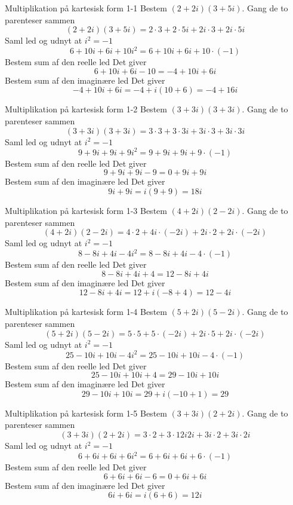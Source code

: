 \documentclass{article}
\begin{document}
\tableofcontents
\newpage
\begin{exercise}{Multiplikation på kartesisk form 1-1}
Bestem $(2 + 2i)(3 + 5i)$.
\hint
Gang de to parenteser sammen
\[(2 + 2i)(3 + 5i) = 2 \cdot 3 + 2 \cdot 5i + 2i \cdot 3 + 2i \cdot 5i
\]
\hint
Saml led og udnyt at $i^2 = - 1$
\[6 + 10i + 6i + 10i^2 = 6 + 10i + 6i + 10 \cdot (-1)
\]
\hint
Bestem sum af den reelle led
\hint
Det giver
\[6 + 10i + 6i - 10 = - 4 + 10i + 6i
\]
\hint
Bestem sum af den imaginære led
\hint
Det giver
\[ - 4 + 10i + 6i = - 4 + i(10 + 6) = - 4 + 16i
\]
\end{exercise}
\newpage
\begin{exercise}{Multiplikation på kartesisk form 1-2}
Bestem $(3 + 3i)(3 + 3i)$.
\hint
Gang de to parenteser sammen
\[(3 + 3i)(3 + 3i) = 3 \cdot 3 + 3 \cdot 3i + 3i \cdot 3 + 3i \cdot 3i
\]
\hint
Saml led og udnyt at $i^2 = - 1$
\[9 + 9i + 9i + 9i^2 = 9 + 9i + 9i + 9 \cdot (-1)
\]
\hint
Bestem sum af den reelle led
\hint
Det giver
\[9 + 9i + 9i - 9 = 0 + 9i + 9i
\]
\hint
Bestem sum af den imaginære led
\hint
Det giver
\[9i + 9i = i(9 + 9) = 18i
\]
\end{exercise}
\newpage
\begin{exercise}{Multiplikation på kartesisk form 1-3}
Bestem $(4 + 2i)(2 - 2i)$.
\hint
Gang de to parenteser sammen
\[(4 + 2i)(2 - 2i) = 4 \cdot 2 + 4i \cdot (-2i) + 2i \cdot 2 + 2i \cdot (-2i)
\]
\hint
Saml led og udnyt at $i^2 = - 1$
\[8 - 8i + 4i - 4i^2 = 8 - 8i + 4i - 4 \cdot (-1)
\]
\hint
Bestem sum af den reelle led
\hint
Det giver
\[8 - 8i + 4i + 4 = 12 - 8i + 4i
\]
\hint
Bestem sum af den imaginære led
\hint
Det giver
\[12 - 8i + 4i = 12 + i(-8 + 4) = 12 - 4i
\]
\end{exercise}
\newpage
\begin{exercise}{Multiplikation på kartesisk form 1-4}
Bestem $(5 + 2i)(5 - 2i)$.
\hint
Gang de to parenteser sammen
\[(5 + 2i)(5 - 2i) = 5 \cdot 5 + 5 \cdot (-2i) + 2i \cdot 5 + 2i \cdot (-2i)
\]
\hint
Saml led og udnyt at $i^2 = - 1$
\[25 - 10i + 10i - 4i^2 = 25 - 10i + 10i - 4 \cdot (-1)
\]
\hint
Bestem sum af den reelle led
\hint
Det giver
\[25 - 10i + 10i + 4 = 29 - 10i + 10i
\]
\hint
Bestem sum af den imaginære led
\hint
Det giver
\[29 - 10i + 10i = 29 + i(-10 + 1) = 29
\]
\end{exercise}
\newpage
\begin{exercise}{Multiplikation på kartesisk form 1-5}
Bestem $(3 + 3i)(2 + 2i)$.
\hint
Gang de to parenteser sammen
\[(3 + 3i)(2 + 2i) = 3 \cdot 2 + 3 \cdot 12i 2i + 3i \cdot 2 + 3i \cdot 2i
\]
\hint
Saml led og udnyt at $i^2 = - 1$
\[6 + 6i + 6i + 6i^2 = 6 + 6i + 6i + 6 \cdot (-1)
\]
\hint
Bestem sum af den reelle led
\hint
Det giver
\[6 + 6i + 6i - 6 = 0 + 6i + 6i
\]
\hint
Bestem sum af den imaginære led
\hint
Det giver
\[6i + 6i = i(6 + 6) = 12i
\]
\end{exercise}
\end{document}
